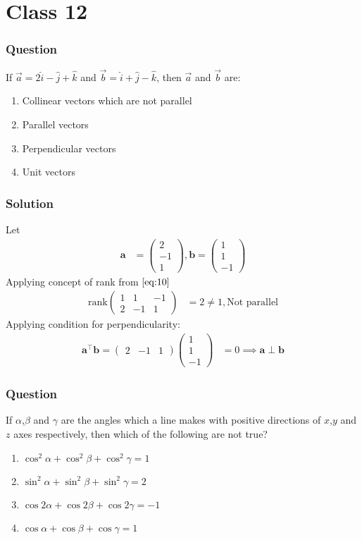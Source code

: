\documentclass{beamer}
\theoremstyle{remark}
\newcommand{\myvec}[1]{\ensuremath{\begin{pmatrix}#1\end{pmatrix}}}
\let\vec\mathbf
\begin{document}
\section{Class 12}
%
\begin{frame}
\frametitle{Question }
If $\overrightarrow{a} = 2\hat{i} - \hat{j} + \hat{k}$ and  $\overrightarrow{b} = \hat{i} + \hat{j} - \hat{k}$, then $\overrightarrow{a}$ and $\overrightarrow{b}$ are:
    \begin{enumerate}
\item  Collinear vectors which are not parallel
\item  Parallel vectors
\item  Perpendicular vectors
\item  Unit vectors
\end{enumerate}
\end{frame}
%
\begin{frame}
\frametitle{Solution}
Let
\begin{align}
    \vec{a} &= \myvec{
        2\\
        -1\\
        1
    } , 
    \vec{b}=\myvec{
        1\\
        1\\
        -1
    }
    \end{align}
    Applying concept of rank from $\eqref{eq:10}$
    \begin{align}
                  \text{rank}\myvec{
        1 & 1 & -1\\
        2 & -1 & 1
    } &=2 \neq 1 ,
    \text{Not parallel}
    \end{align}
    Applying condition for perpendicularity:
    \begin{align}
            \vec{a}^{\top}\vec{b} = \myvec{
        2 &-1 &1
    }\myvec{
        1\\
        1\\
        -1
    } &= 0
    \implies \vec{a} \perp \vec{b}
\end{align}
\end{frame}
%
\begin{frame}
\frametitle{Question }
If $\alpha$,$\beta$ and $\gamma$ are the angles which a line makes with positive directions of $x$,$y$ and $z$ axes respectively, then which of the following are {not} true?
    \begin{enumerate}
\item  $\cos^2{\alpha} + \cos^2{\beta} + \cos^2{\gamma} = 1$
\item  $\sin^2{\alpha} + \sin^2{\beta} + \sin^2{\gamma} = 2$
\item  $\cos{2\alpha} + \cos{2\beta} + \cos{2\gamma} =-1$
\item  $\cos{\alpha} + \cos{\beta} + \cos{\gamma} = 1$
\end{enumerate}
\end{frame}
\end{document}
